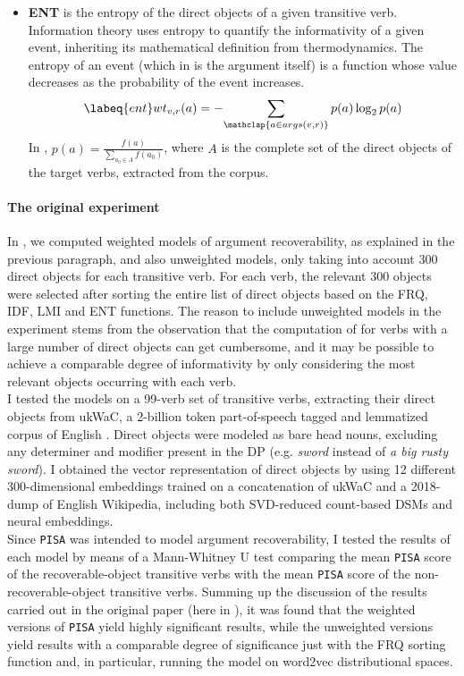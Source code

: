 \begin{itemize}
\item \textbf{ENT} is the entropy \parencite{shannon1948mathematical} of the direct objects of a given transitive verb. Information theory uses entropy to quantify the informativity of a given event, inheriting its mathematical definition from thermodynamics. The entropy of an event (which in  is the argument itself) is a function whose value decreases as the probability of the event increases.
 \begin{equation} \labeq{ent}
wt_{v,r}(a) = -\!\sum_{\mathclap{a \in args(v,r)}} p(a) \log _{2}p(a)
\end{equation}
In , $p(a) = \frac{f(a)}{\sum_{a_0 \in A}f(a_0)}$, where $A$ is the complete set of the direct objects of the target verbs, extracted from the corpus.
\end{itemize}

\paragraph{The original experiment}
In \textcite{CappelliLenciPISA}, we computed weighted models of argument recoverability, as explained in the previous paragraph, and also unweighted models, only taking into account 300 direct objects for each transitive verb. For each verb, the relevant 300 objects were selected after sorting the entire list of direct objects based on the FRQ, IDF, LMI and ENT functions. The reason to include unweighted models in the experiment stems from the observation that the computation of  for verbs with a large number of direct objects can get cumbersome, and it may be possible to achieve a comparable degree of informativity by only considering the most relevant objects occurring with each verb.\\
I tested the models on a 99-verb set of transitive verbs, extracting their direct objects from ukWaC, a 2-billion token part-of-speech tagged and lemmatized corpus of English \parencite{FerraresiEtAl2008}. Direct objects were modeled as bare head nouns, excluding any determiner and modifier present in the DP (e.g. \textit{sword} instead of \textit{a big rusty sword}). I obtained the vector representation of direct objects by using 12 different 300-dimensional embeddings trained on a concatenation of ukWaC and a 2018-dump of English Wikipedia, including both SVD-reduced count-based DSMs and neural embeddings.\\
Since \texttt{PISA} was intended to model argument recoverability, I tested the results of each model by means of a Mann-Whitney U test comparing the mean \texttt{PISA} score of the recoverable-object transitive verbs with the mean \texttt{PISA} score of the non-recoverable-object transitive verbs. Summing up the discussion of the results carried out in the original paper (here in ), it was found that the weighted versions of \texttt{PISA} yield highly significant results, while the unweighted versions yield results with a comparable degree of significance just with the FRQ sorting function and, in particular, running the model on word2vec \parencite{mikolov2013efficient} distributional spaces.

